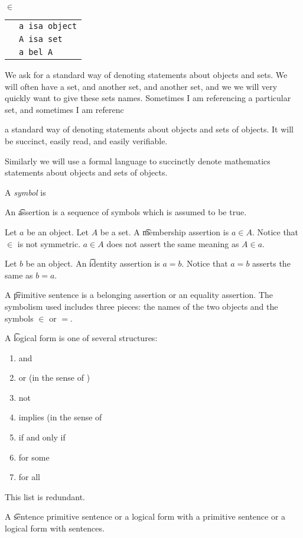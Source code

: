 \texttt{$\in$}

\begin{tabular}{cl}
  & \texttt{a isa object} \\
  & \texttt{A isa set} \\
  & \texttt{a bel A}

\end{tabular}


We ask for a standard way of denoting statements about objects and sets.
We will often have a set, and another set, and another set, and we we will very quickly want to give these sets names.
Sometimes I am referencing a particular set, and sometimes I am referenc

 a standard way of denoting statements about objects and sets of objects.
It will be succinct, easily read, and easily verifiable.


Similarly we will use a formal language to succinctly denote mathematics statements about objects and sets of objects.



A \textit{symbol} is 


An \t{assertion} is a sequence of symbols which is assumed to be true.

Let $a$ be an object.
Let $A$ be a set.
A \t{membership assertion} is $a \in A$.
Notice that $\in$ is not symmetric.
$a \in A$ does not assert the same meaning as $A \in a$.

Let $b$ be an object.
An \t{identity assertion}
is $a = b$.
Notice that $a = b$
asserts the same as $b = a$.

A \t{primitive sentence} is a belonging assertion or an equality assertion.
The symbolism used includes three pieces: the names of the two objects and the symbols $\in$ or $=$.

A \t{logical form} is one of several structures:

\begin{enumerate}

  \item

    and

  \item

    or (in the sense of )

  \item

    not

  \item

    implies (in the sense of 

  \item

    if and only if

  \item

    for some

  \item

    for all
\end{enumerate}

This list is redundant.

A \t{sentence} primitive sentence or a logical form with a primitive sentence or a logical form with sentences.
